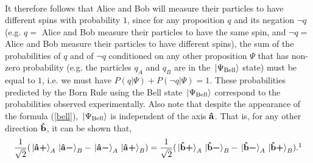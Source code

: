 {\begin{equation*}
\begin{split}
\end{split}
\end{equation*}
It therefore follows that Alice and Bob will measure their particles to have different spins with probability $1$, since for any proposition $q$ and its negation $\neg q$ (e.g. $q =$ Alice and Bob measure their particles to have the same spin, and $\neg q = $ Alice and Bob measure their particles to have different spins), the sum of the probabilities of $q$ and of $\neg q$ conditioned on any other proposition $\Psi$ that has non-zero probability (e.g. the particles $q_A$ and $q_B$ are in the $\ket*{\Psi_{\text{Bell}}}$ state) must be equal to $1$, i.e. we must have $P(q|\Psi)+P(\neg q|\Psi)=1.$} 
These probabilities predicted by the Born Rule using the Bell state $\ket*{\Psi_{\text{Bell}}}$ correspond to the probabilities observed experimentally. Also note that despite the appearance of the formula (\ref{bell}), $\ket*{\Psi_{\text{Bell}}}$ is independent of the axis $\vb{\hat{{a}}}$. That is, for any other direction $\vb{\hat{{b}}}$, it can be shown that,
\begin{equation}\label{bellstate2}\frac{1}{\sqrt{2}}(\ket*{\uvbp{a}}_A\ket*{\uvbm{a}}_B-\ket*{\uvbm{a}}_A\ket*{\uvbp{a}}_B)=\frac{1}{\sqrt{2}}(\ket*{\uvbp{b}}_A\ket*{\uvbm{b}}_B-\ket*{\uvbm{b}}_A\ket*{\uvbp{b}}_B).\protect\footnotemark\end{equation}
